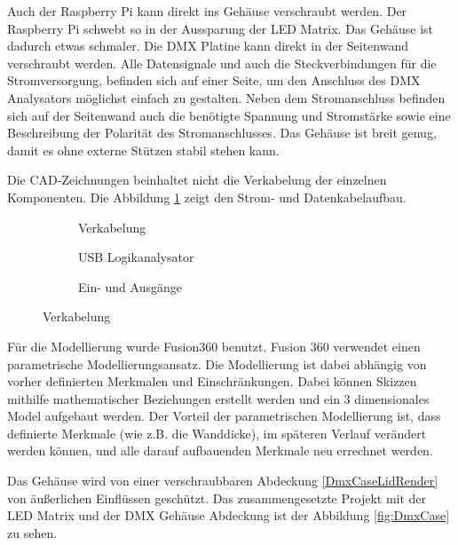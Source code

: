Auch der Raspberry Pi kann direkt ins Gehäuse verschraubt werden. Der Raspberry Pi schwebt so in der Aussparung der LED Matrix. Das Gehäuse ist dadurch etwas schmaler. Die DMX Platine kann direkt in der Seitenwand verschraubt werden. Alle Datensignale und auch die Steckverbindungen für die Stromversorgung, befinden sich auf einer Seite, um den Anschluss des DMX Analysators möglichst einfach zu gestalten. Neben dem Stromanschluss befinden sich auf der Seitenwand auch die benötigte Spannung und Stromstärke sowie eine Beschreibung der Polarität des Stromanschlusses. Das Gehäuse ist breit genug, damit es ohne externe Stützen stabil stehen kann. 

Die CAD-Zeichnungen beinhaltet nicht die Verkabelung der einzelnen Komponenten. Die Abbildung \ref{fig:DmxCaseWiring} zeigt den Strom- und Datenkabelaufbau.

\begin{figure}[H]
	\centering
	\begin{subfigure}{.32\textwidth}
		\centering
		\caption{Verkabelung}
	\end{subfigure}
	\hfill
	\begin{subfigure}{.32\textwidth}
		\centering
		\caption{USB Logikanalysator}
	\end{subfigure}
	\hfill
	\begin{subfigure}{.32\textwidth}
		\centering
		\caption{Ein- und Ausgänge}
	\end{subfigure}
	\caption{Verkabelung}
	\label{fig:DmxCaseWiring}
\end{figure}

Für die Modellierung wurde Fusion360 benutzt. Fusion 360 verwendet einen parametrische Modellierungsansatz. Die Modellierung ist dabei abhängig von vorher definierten Merkmalen und Einschränkungen. Dabei können Skizzen mithilfe mathematischer Beziehungen erstellt werden und ein 3 dimensionales Model aufgebaut werden. Der Vorteil der parametrischen Modellierung ist, dass definierte Merkmale (wie z.B. die Wanddicke), im späteren Verlauf verändert werden können, und alle darauf aufbauenden Merkmale neu errechnet werden. 

Das Gehäuse wird von einer verschraubbaren Abdeckung \ref{DmxCaseLidRender} von äußerlichen Einflüssen geschützt. Das zusammengesetzte Projekt mit der LED Matrix und der DMX Gehäuse Abdeckung ist der Abbildung \ref{fig:DmxCase} zu sehen.

